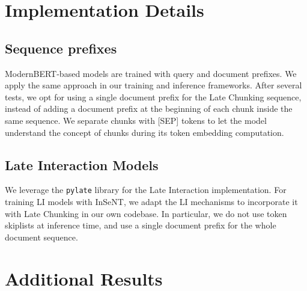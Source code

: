 



\section{Implementation Details}

\subsection{Sequence prefixes}

ModernBERT-based models are trained with query and document prefixes. We apply the same approach in our training and inference frameworks. After several tests, we opt for using a single document prefix for the Late Chunking sequence, instead of adding a document prefix at the beginning of each chunk inside the same sequence. We separate chunks with [SEP] tokens to let the model understand the concept of chunks during its token embedding computation.


\subsection{Late Interaction Models}

We leverage the \texttt{pylate}  library for the Late Interaction implementation. For training LI models with InSeNT, we adapt the LI mechanisms to incorporate it with Late Chunking in our own codebase. In particular, we do not use token skiplists at inference time, and use a single document prefix for the whole document sequence.

\section{Additional Results}
\label{app:res}

